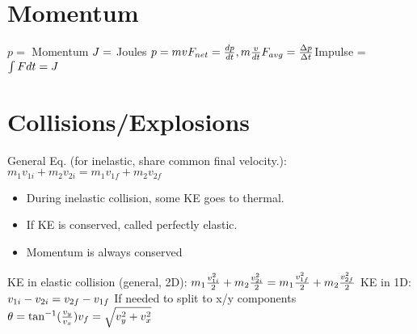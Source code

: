 \documentclass[11pt]{article}
\begin{document}
\begin{paracol}{3}
        \section*{Momentum}
        \begin{fleqn}
            $
            p = $ Momentum $ \newline
            J = $ Joules $ \newline
            p=mv \newline
            F_{net} = \frac{dp}{dt}, m\frac{v}{dt} \newline
            F_{avg} = \frac{\Delta p}{\Delta t} \newline
            $Impulse = $\int Fdt = J \newline
            $
        \end{fleqn}
        \section*{Collisions/Explosions}
        \begin{fleqn}
            General Eq. (for inelastic, share common final velocity.): \newline
            $
            m_1 v_{1i} + m_2 v_{2i} = m_1 v_{1f} + m_2 v_{2f}
            $
            \begin{itemize}
                \item During inelastic collision, some KE goes to thermal.
                \item If KE is conserved, called perfectly elastic.
                \item Momentum is always conserved
            \end{itemize}
            KE in elastic collision (general, 2D): \newline
            $
            m_1 \frac{v_{1i}^2}{2} + m_2 \frac{v_{2i}^2}{2} = m_1 \frac{v_{1f}^2}{2} + m_2 \frac{v_{2f}^2}{2} \newline
            $
            KE in 1D:
            $
            v_{1i} - v_{2i} = v_{2f} - v_{1f} \newline
            $
            If needed to split to x/y components
            $
            \theta = \tan^{-1}(\frac{v_y}{v_x}) \newline
            v_f = \sqrt{v_y^2 + v_x^2} \newline
            $
        \end{fleqn}

\end{paracol}
\end{document}
